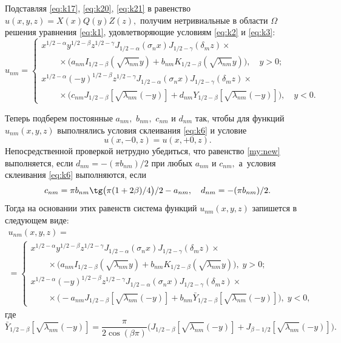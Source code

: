 Подставляя \eqref{eq:k17}, \eqref{eq:k20}, \eqref{eq:k21} в равенство $u(x,y,z)=X(x)Q(y)Z(z),$ получим нетривиальные в области $\Omega $ решения уравнения \eqref{eq:k1}, удовлетворяющие условиям \eqref{eq:k2} и \eqref{eq:k3}:
$$
u_{nm}=\left\{ 
\begin{array}{l}
x^{ 1/2 -\alpha}y^{ 1/2 -\beta}z^{ 1/2 -\gamma}J_{ 1/2 -\alpha}(\sigma_n x)J_{ 1/2 -\gamma}(\delta_m z) \times  
\\
\qquad 
\times
\bigl(a_{nm} I_{ 1/2 -\beta}(\sqrt{\lambda_{nm}}y)+b_{nm}K_{ 1/2 -\beta}(\sqrt{\lambda_{nm}}y)\bigr),\quad y > 0;
\\[2mm]
x^{ 1/2 -\alpha}(-y)^{ 1/2 -\beta}z^{ 1/2 -\gamma}J_{ 1/2 -\alpha}(\sigma_n x)J_{ 1/2 -\gamma}(\delta_m z) \times  
\\
\qquad 
\times
\bigl(c_{nm}J_{ 1/2 -\beta}[\sqrt{\lambda_{nm}}(-y)]+d_{nm}Y_{1/2-\beta}[\sqrt{\lambda_{nm}}(-y)]\bigr),
\quad y < 0.
\end{array} \right.
$$

Теперь подберем постоянные $a_{nm},$ $b_{nm},$ $c_{nm}$ и $d_{nm} $ так, чтобы для функций $u_{nm}(x,y,z)$ выполнялись условия склеивания \eqref{eq:k6} и условие 
\begin{equation}
u(x,-0,z)=u(x,+0,z).
\label{my:new}
\end{equation}
Непосредственной проверкой нетрудно убедиться, что равенство \eqref{my:new}  выполняется, 
если $d_{nm}=-(\pi b_{nm})/2$ при любых $a_{nm}$ и $c_{nm},$ а~условия склеивания \eqref{eq:k6} выполняются, если 
$$
c_{nm}= \pi b_{nm}\tg \bigl(\pi(1+2\beta)/4\bigr)/2-a_{nm}, 
\quad 
d_{nm}=-(\pi b_{nm})/2.
$$ 
Тогда на основании этих равенств система функций $u_{nm}(x,y,z)$ запишется в следующем виде:
\begin{multline}
u_{nm}{(x,y,z)}=
\\
=\left\{ 
\begin{array}{l}
x^{ 1/2 -\alpha}y^{ 1/2 -\beta}z^{ 1/2 -\gamma}J_{ 1/2 -\alpha}(\sigma_n x)J_{ 1/2 -\gamma}(\delta_m z)\times  
 \\
 \qquad 
\times\bigl ( a_{nm}I_{ 1/2 -\beta}(\sqrt{\lambda_{nm}}y)+b_{nm}K_{ 1/2 -\beta}(\sqrt{\lambda_{nm}}y)\bigr) ,\; y > 0; 
\\[2mm]
x^{ 1/2 -\alpha}(-y)^{ 1/2 -\beta}z^{ 1/2 -\gamma}J_{ 1/2 -\alpha}(\sigma_n x)J_{ 1/2 -\gamma}(\delta_m z)\times  
\\
\qquad 
\times
\bigl( -a_{nm}J_{ 1/2 -\beta}[\sqrt{\lambda_{nm}}(-y)]+b_{nm}\bar Y_{ 1/2 -\beta}[\sqrt{\lambda_{nm}}(-y)]\bigr) , \; y < 0,
 \end{array} \right.
\label{eq:k22}
\end{multline}
где
$$
\bar Y_{ 1/2 -\beta}[\sqrt{\lambda_{nm}}(-y)] =
\frac{\pi}{2\cos(\beta\pi)} 
\bigl( J_{ 1/2 -\beta}[\sqrt{\lambda_{nm}}(-y)]+J_{\beta- 1/2 }[\sqrt{\lambda_{nm}}(-y)]\bigr).
$$


